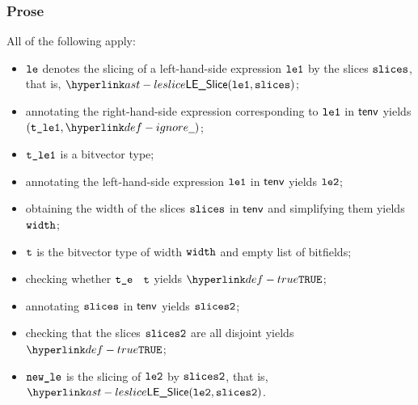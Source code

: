 \subsubsection{Prose}
All of the following apply:
\begin{itemize}
  \item $\texttt{le}$ denotes the slicing of a left-hand-side expression $\texttt{le1}$ by the slices $\texttt{slices}$, that is, $\LESlice(\vleone, \slices)$;
  \item annotating the right-hand-side expression corresponding to $\texttt{le1}$ in $\textsf{tenv}$ yields \\
        $(\vtleone, \Ignore)$\ProseOrTypeError;
  \item $\texttt{t\_le1}$ is a bitvector type;
  \item annotating the left-hand-side expression $\texttt{le1}$ in $\textsf{tenv}$ yields $\texttt{le2}$\ProseOrTypeError;
  \item obtaining the width of the slices $\texttt{slices}$ in $\textsf{tenv}$ and simplifying them yields $\texttt{width}$;
  \item $\texttt{t}$ is the bitvector type of width $\texttt{width}$ and empty list of bitfields;
  \item checking whether $\texttt{t\_e}$ \typesatisfies\ $\texttt{t}$ yields $\True$\ProseOrTypeError;
  \item annotating $\texttt{slices}$ in $\textsf{tenv}$ yields $\texttt{slices2}$\ProseOrTypeError;
  \item checking that the slices $\texttt{slices2}$ are all disjoint yields $\True$\ProseOrTypeError;
  \item $\texttt{new\_le}$ is the slicing of $\texttt{le2}$ by $\texttt{slices2}$, that is, $\LESlice(\vletwo, \slicestwo)$.
\end{itemize}
